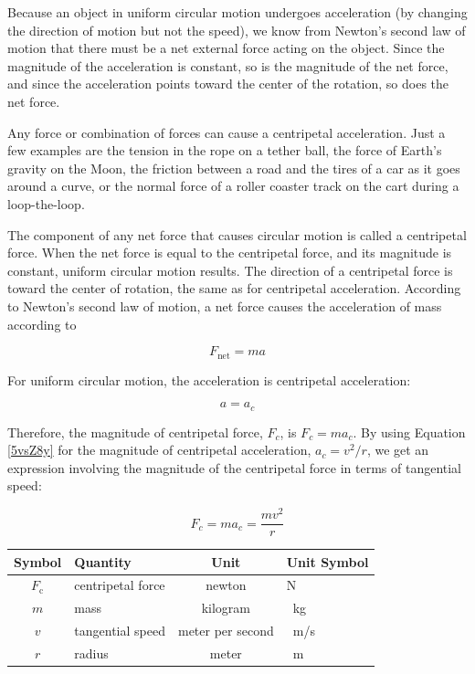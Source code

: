 \documentclass[main-physics.tex]{subfiles}
\begin{document}
\vspace{1em}

Because an object in uniform circular motion undergoes acceleration (by changing the direction of motion but not the speed), we know from Newton's second law of motion that there must be a net external force acting on the object. Since the magnitude of the acceleration is constant, so is the magnitude of the net force, and since the acceleration points toward the center of the rotation, so does the net force.

\vspace{1em}

Any force or combination of forces can cause a centripetal acceleration. Just a few examples are the tension in the rope on a tether ball, the force of Earth's gravity on the Moon, the friction between a road and the tires of a car as it goes around a curve, or the normal force of a roller coaster track on the cart during a loop-the-loop.

\vspace{1em}

The component of any net force that causes circular motion is called a \gls{centripetal force}. When the net force is equal to the centripetal force, and its magnitude is constant, uniform circular motion results. The direction of a centripetal force is toward the center of rotation, the same as for centripetal acceleration. According to Newton's second law of motion, a net force causes the acceleration of mass according to 

\begin{equation*}
    F_{\text{net}} = ma
\end{equation*}

For uniform circular motion, the acceleration is centripetal acceleration: 

\begin{equation*}
    a = a_c
\end{equation*}

Therefore, the magnitude of centripetal force, $F_c$, is $F_c = m a_c$. By using Equation \eqref{5vsZ8y} for the magnitude of centripetal acceleration, $a_c = v^2/r$, we get an expression involving the magnitude of the centripetal force in terms of tangential speed:

\begin{equation} \label{4H9EJq}
    F_c = m a_c = \frac{m v^2}{r}
\end{equation}

\begin{center}
    \begin{tabular}{cl|cl}
    \hline
    \textbf{Symbol} & \textbf{Quantity} & \textbf{Unit} & \textbf{Unit Symbol}  \\
    \hline\hline
    \rule{0pt}{2.5ex}
        $F_{\text{c}}$ & centripetal force & newton & N\\
        $m$ & mass & kilogram & \SI{}{kg}\\
        $v$ & tangential speed & meter per second & \SI{}{m/s} \\
        $r$ & radius & meter & \SI{}{m}\\
    \hline
    \end{tabular}
\end{center}
\end{document}
